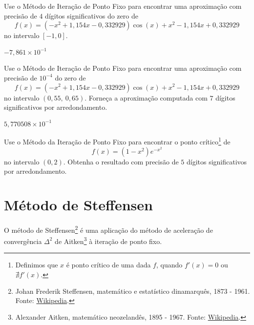 \begin{exer}
  Use o Método de Iteração de Ponto Fixo para encontrar uma aproximação com precisão de $4$ dígitos significativos do zero de 
  \begin{equation}
    f(x) = (-x^2+1,154x-0,332929)\cos(x) + x^2 - 1,154x + 0,332929
  \end{equation}
  no intervalo $[-1, 0]$.
\end{exer}
\begin{resp}
  $-7,861\times 10^{-1}$
\end{resp}

\begin{exer}
  Use o Método de Iteração de Ponto Fixo para encontrar uma aproximação com precisão de $10^{-4}$ do zero de
  \begin{equation}
    f(x) = (-x^2+1,154x-0,332929)\cos(x) + x^2 - 1,154x + 0,332929
  \end{equation}
no intervalo $(0,55, ~0,65)$. Forneça a aproximação computada com $7$ dígitos significativos por arredondamento.
\end{exer}
\begin{resp}
  $5,770508\times 10^{-1}$
\end{resp}

\begin{exer}
  Use o Método da Iteração de Ponto Fixo para encontrar o ponto crítico\footnote{Definimos que $x$ é ponto crítico de uma dada $f$, quando $f'(x) = 0$ ou $\nexists f'(x)$.} de
  \begin{equation}
    f(x) = (1-x^2)e^{-x^2}
  \end{equation}
  no intervalo $(0, 2)$. Obtenha o resultado com precisão de $5$ dígitos significativos por arredondamento.
\end{exer}

\section{Método de Steffensen}\label{cap_eq1d_sec_Steffensen}

O método de Steffensen\footnote{Johan Frederik Steffensen, matemático e estatístico dinamarquês, 1873 - 1961. Fonte: \href{https://en.wikipedia.org/wiki/Johan_Frederik_Steffensen}{Wikipedia}.} é uma aplicação do método de aceleração de convergência $\Delta^2$ de Aitken\footnote{Alexander Aitken, matemático neozelandês, 1895 - 1967. Fonte: \href{https://en.wikipedia.org/wiki/Alexander_Aitken}{Wikipedia}.} à iteração de ponto fixo.

